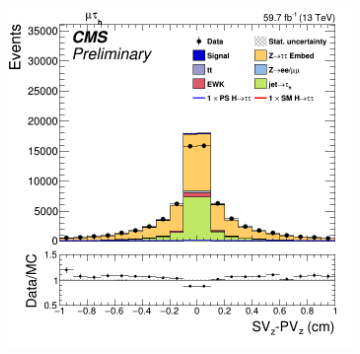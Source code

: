 \begin{figure}
\begin{subfigure}[b]{0.33\linewidth}
    \caption{} 
    \vspace{0.5ex}
  \end{subfigure} 
    \begin{subfigure}[b]{0.33\linewidth}
    \centering
    \includegraphics[width=\linewidth]{Chapitre7/Images/TauFlightZztt.png} 
    \caption{} 
    \vspace{0.5ex}
  \end{subfigure} 


\end{figure}

